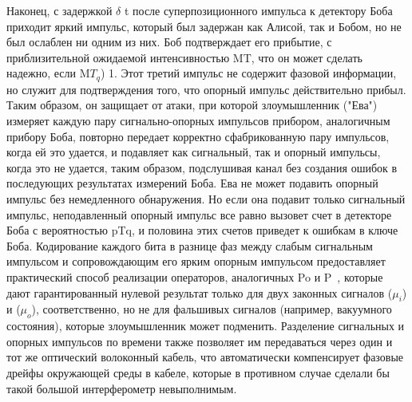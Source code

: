 Наконец, с задержкой $\delta$ t после суперпозиционного импульса к детектору Боба приходит яркий импульс, который был задержан как Алисой, так и Бобом, но не был ослаблен ни одним из них. Боб подтверждает его прибытие, с приблизительной ожидаемой интенсивностью MT, что он может сделать надежно, если M$T_q$) 1. Этот третий импульс не содержит фазовой информации, но служит для подтверждения того, что опорный импульс действительно прибыл. Таким образом, он защищает от атаки, при которой злоумышленник ("Ева") измеряет каждую пару сигнально-опорных импульсов прибором, аналогичным прибору Боба, повторно передает корректно сфабрикованную пару импульсов, когда ей это удается, и подавляет как сигнальный, так и опорный импульсы, когда это не удается, таким образом, подслушивая канал без создания ошибок в последующих результатах измерений Боба. Ева не может подавить опорный импульс без немедленного обнаружения. Но если она подавит только сигнальный импульс, неподавленный опорный импульс все равно вызовет счет в детекторе Боба с вероятностью pTq, и половина этих счетов приведет к ошибкам в ключе Боба.
Кодирование каждого бита в разнице фаз между слабым сигнальным импульсом и сопровождающим его ярким опорным импульсом предоставляет практический способ реализации операторов, аналогичных Po и P~, которые дают гарантированный нулевой результат только для двух законных сигналов ($\mu_i$) и ($\mu_o$), соответственно, но не для фальшивых сигналов (например, вакуумного состояния), которые злоумышленник может подменить. Разделение сигнальных и опорных импульсов по времени также позволяет им передаваться через один и тот же оптический волоконный кабель, что автоматически компенсирует фазовые дрейфы окружающей среды в кабеле, которые в противном случае сделали бы такой большой интерферометр невыполнимым.

